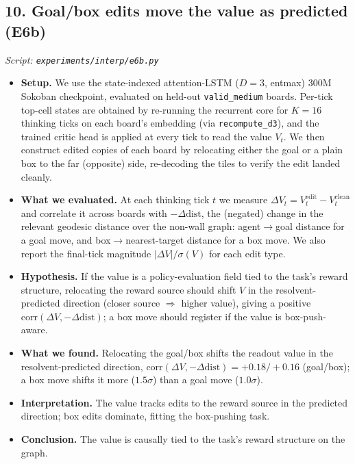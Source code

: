 \documentclass[11pt]{article}
\begin{document}
\subsection*{10. Goal/box edits move the value as predicted (E6b)}
\textit{Script: \texttt{experiments/interp/e6b.py}}
\begin{itemize}
\item \textbf{Setup.} We use the state-indexed attention-LSTM ($D=3$, entmax) 300M Sokoban checkpoint, evaluated on held-out \texttt{valid\_medium} boards. Per-tick top-cell states are obtained by re-running the recurrent core for $K=16$ thinking ticks on each board's embedding (via \texttt{recompute\_d3}), and the trained critic head is applied at every tick to read the value $V_t$. We then construct edited copies of each board by relocating either the goal or a plain box to the far (opposite) side, re-decoding the tiles to verify the edit landed cleanly.
\item \textbf{What we evaluated.} At each thinking tick $t$ we measure $\Delta V_t = V_t^{\text{edit}} - V_t^{\text{clean}}$ and correlate it across boards with $-\Delta\text{dist}$, the (negated) change in the relevant geodesic distance over the non-wall graph: agent$\rightarrow$goal distance for a goal move, and box$\rightarrow$nearest-target distance for a box move. We also report the final-tick magnitude $|\Delta V|/\sigma(V)$ for each edit type.
\item \textbf{Hypothesis.} If the value is a policy-evaluation field tied to the task's reward structure, relocating the reward source should shift $V$ in the resolvent-predicted direction (closer source $\Rightarrow$ higher value), giving a positive $\mathrm{corr}(\Delta V, -\Delta\text{dist})$; a box move should register if the value is box-push-aware.
\item \textbf{What we found.} Relocating the goal/box shifts the readout value in the resolvent-predicted direction, $\mathrm{corr}(\Delta V,-\Delta\mathrm{dist})=+0.18/+0.16$ (goal/box); a box move shifts it more ($1.5\sigma$) than a goal move ($1.0\sigma$).
\item \textbf{Interpretation.} The value tracks edits to the reward source in the predicted direction; box edits dominate, fitting the box-pushing task.
\item \textbf{Conclusion.} The value is causally tied to the task's reward structure on the graph.
\end{itemize}
\clearpage
\end{document}
